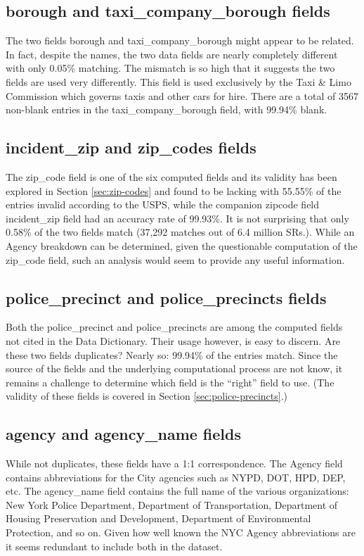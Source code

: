 \documentclass[12pt, titlepage]{article}
\begin{document}
\subsection{borough and taxi\_company\_borough fields}
\label{sec:taxicompanyborough}
The two fields borough and taxi\_company\_borough might appear to be 
related. In fact, despite the names, the two data fields are nearly 
completely different with only 0.05\% matching. The mismatch is so 
high that it suggests the two fields are used very differently. This field 
is used exclusively by the Taxi \& Limo Commission which governs 
taxis and other cars for hire. There are a total of 3567 non-blank 
entries in the taxi\_company\_borough field, with 99.94\% blank.

 \subsection{incident\_zip and zip\_codes fields}
 \label{sec:zipcodes}
 The zip\_code field is one of the six computed fields and its validity 
 has been explored in Section \ref{sec:zip-codes} and found to be 
 lacking with 55.55\% of the entries invalid according to the 
 USPS, while the companion zipcode field incident\_zip field had 
 an accuracy rate of 99.93\%. It is not surprising that only 0.58\% of 
 the two fields match (37,292 matches out of 6.4 million SRs.). While 
 an Agency breakdown can be determined, given the questionable 
 computation of the zip\_code field, such an analysis would seem 
 to provide any useful information.  

 \subsection{police\_precinct and police\_precincts fields} 
 \label{sec:police} 
Both the police\_precinct and police\_precincts are among the computed 
fields not cited in the Data Dictionary. Their usage however, is easy to 
discern. Are these two fields duplicates? Nearly so:  99.94\% of the entries 
match. Since the source of the fields and the underlying computational 
process are not know, it remains a challenge to determine which 
field is the ``right'' field to use. (The validity of these fields is 
covered in Section \ref{sec:police-precincts}.)

 \subsection{agency and agency\_name fields}
 \label{sec:agencyname}
 While not duplicates, these fields have a 1:1 correspondence.  The Agency 
 field contains abbreviations for the City agencies such as NYPD, DOT, 
 HPD, DEP, etc. The agency\_name field contains the full name of 
 the various organizations: New York Police Department, Department 
 of Transportation, Department of Housing Preservation and 
 Development, Department of Environmental Protection, and so on. Given 
 how well known the NYC Agency abbreviations are it seems redundant 
 to include both in the dataset.
\end{document}
